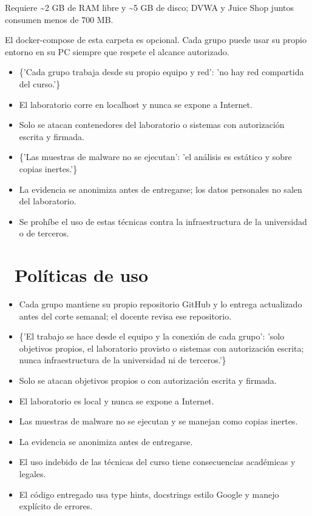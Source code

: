 \documentclass[11pt,a4paper]{article}
\newcommand{\iconotexto}[2]{\textcolor{cyanNeon}{\faIcon{#1}}~#2}
\begin{document}
Requiere \textasciitilde{}2 GB de RAM libre y \textasciitilde{}5 GB de disco; DVWA y Juice Shop juntos consumen menos de 700 MB.

El docker-compose de esta carpeta es opcional. Cada grupo puede usar su propio entorno en su PC siempre que respete el alcance autorizado.

\begin{itemize}[leftmargin=1.4em,itemsep=2pt,topsep=3pt]
  \item \{'Cada grupo trabaja desde su propio equipo y red': 'no hay red compartida del curso.'\}
  \item El laboratorio corre en localhost y nunca se expone a Internet.
  \item Solo se atacan contenedores del laboratorio o sistemas con autorización escrita y firmada.
  \item \{'Las muestras de malware no se ejecutan': 'el análisis es estático y sobre copias inertes.'\}
  \item La evidencia se anonimiza antes de entregarse; los datos personales no salen del laboratorio.
  \item Se prohíbe el uso de estas técnicas contra la infraestructura de la universidad o de terceros.
\end{itemize}

\section{\iconotexto{balance-scale}{Políticas de uso}}

\begin{itemize}[leftmargin=1.4em,itemsep=2pt,topsep=3pt]
  \item Cada grupo mantiene su propio repositorio GitHub y lo entrega actualizado antes del corte semanal; el docente revisa ese repositorio.
  \item \{'El trabajo se hace desde el equipo y la conexión de cada grupo': 'solo objetivos propios, el laboratorio provisto o sistemas con autorización escrita; nunca infraestructura de la universidad ni de terceros.'\}
  \item Solo se atacan objetivos propios o con autorización escrita y firmada.
  \item El laboratorio es local y nunca se expone a Internet.
  \item Las muestras de malware no se ejecutan y se manejan como copias inertes.
  \item La evidencia se anonimiza antes de entregarse.
  \item El uso indebido de las técnicas del curso tiene consecuencias académicas y legales.
  \item El código entregado usa type hints, docstrings estilo Google y manejo explícito de errores.
\end{itemize}
\end{document}
